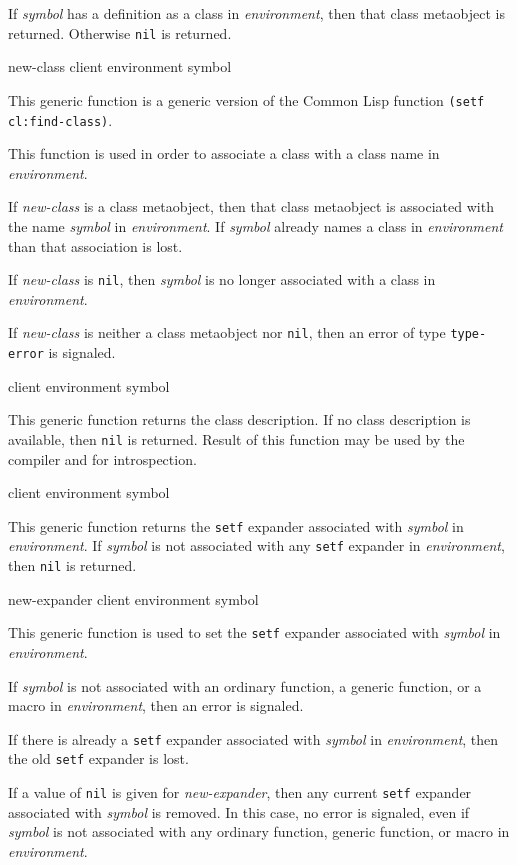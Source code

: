 If \textit{symbol} has a definition as a class in
\textit{environment}, then that class metaobject is returned.
Otherwise \texttt{nil} is returned.

 {new-class client environment symbol}

This generic function is a generic version of the Common Lisp function
\texttt{(setf cl:find-class)}.

This function is used in order to associate a class with a class name
in \textit{environment}.

If \textit{new-class} is a class metaobject, then that class
metaobject is associated with the name \textit{symbol} in
\textit{environment}.  If \textit{symbol} already names a class in
\textit{environment} than that association is lost.

If \textit{new-class} is \texttt{nil}, then \textit{symbol} is no
longer associated with a class in \textit{environment}.

If \textit{new-class} is neither a class metaobject nor \texttt{nil},
then an error of type \texttt{type-error} is signaled.

 {client environment symbol}

This generic function returns the class description. If no class description
is available, then \texttt{nil} is returned. Result of this function may be
used by the compiler and for introspection.

 {client environment symbol}

This generic function returns the \texttt{setf} expander associated
with \textit{symbol} in \textit{environment}.  If \textit{symbol} is
not associated with any \texttt{setf} expander in
\textit{environment}, then \texttt{nil} is returned.

 {new-expander client environment symbol}

This generic function is used to set the \texttt{setf} expander
associated with \textit{symbol} in \textit{environment}.

If \textit{symbol} is not associated with an ordinary function, a
generic function, or a macro in \textit{environment}, then an error is
signaled.

If there is already a \texttt{setf} expander associated with
\textit{symbol} in \textit{environment}, then the old \texttt{setf}
expander is lost.

If a value of \texttt{nil} is given for \textit{new-expander}, then
any current \texttt{setf} expander associated with \textit{symbol} is
removed.  In this case, no error is signaled, even if \textit{symbol}
is not associated with any ordinary function, generic function, or
macro in \textit{environment}.

